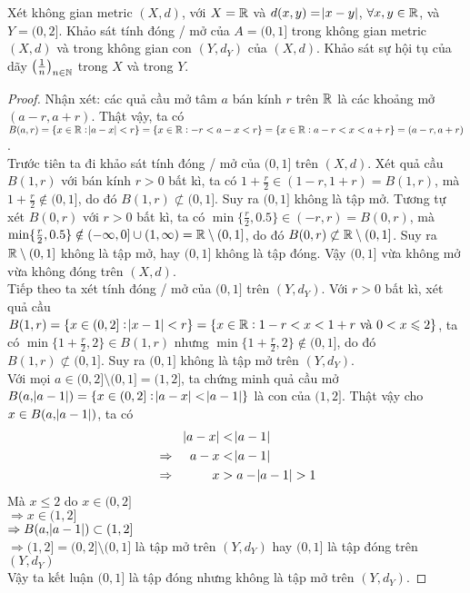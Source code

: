 \begin{exercise}{14}
    Xét không gian metric $(X,d)$, với $X=\mathbb R$ và $d(x,y)=\abs{x-y}$, $\forall x,y \in \mathbb R$, và $Y = (0,2]$. Khảo sát tính đóng / mở của $A=(0,1]$ trong không gian metric $(X,d)$ và trong không gian con $(Y,d_Y)$ của $(X,d)$. Khảo sát sự hội tụ của dãy $\left(\frac{1}{n}\right)_{n\in\mathbb N}$ trong $X$ và trong $Y$.
\end{exercise}

\begin{proof}
Nhận xét: các quả cầu mở tâm $a$ bán kính $r$ trên $\mathbb R$ là các khoảng mở $(a-r,a+r)$. Thật vậy, ta có $B(a,r) = \{x\in\mathbb R : \abs{a-x} < r \} = \{x\in\mathbb R : -r < a-x < r \} = \{x\in\mathbb R : a-r < x < a+r\} = (a-r,a+r)$.\\[3mm]
Trước tiên ta đi khảo sát tính đóng / mở của $(0,1]$ trên $(X,d)$. Xét quả cầu $B(1,r)$ với bán kính $r > 0$ bất kì, ta có $1+\frac{r}{2} \in (1-r,1+r) = B(1,r)$, mà $1 + \frac{r}{2} \notin (0,1]$, do đó $B(1,r) \not\subset (0,1]$. Suy ra $(0,1]$ không là tập mở.\nll
Tương tự xét $B(0,r)$ với $r > 0$ bất kì, ta có $\min\{\frac{r}{2}, 0.5\} \in (-r,r) = B(0,r)$, mà $\min\{\frac{r}{2}, 0.5\} \notin (-\infty,0] \cup (1,\infty) = \mathbb R \setminus (0,1]$, do đó $B(0,r) \not\subset \mathbb R \setminus (0,1]$. Suy ra $\mathbb R \setminus (0,1]$ không là tập mở, hay $(0,1]$ không là tập đóng.\nll
Vậy $(0,1]$ vừa không mở vừa không đóng trên $(X,d)$.\QEDFill\\[3mm]
Tiếp theo ta xét tính đóng / mở của $(0,1]$ trên $(Y,d_Y)$. Với $r > 0$ bất kì, xét quả cầu $B(1,r) = \{x \in (0,2] : \abs{x-1} < r\} = \{x \in \mathbb R : 1-r < x < 1+r \text{ và } 0 < x \leqslant 2\}$, ta có $\min\{1 + \frac{r}{2}, 2\} \in B(1,r)$ nhưng $\min\{1 + \frac{r}{2}, 2\} \notin (0, 1]$, do đó $B(1,r) \not\subset (0,1]$. Suy ra $(0,1]$ không là tập mở trên $(Y,d_Y)$.\\[3mm]
Với mọi $a \in (0,2] \setminus (0,1] = (1,2]$, ta chứng minh quả cầu mở $B(a,\abs{a-1}) =  \{x \in (0,2] : \abs{a-x} < \abs{a-1}\}$ là con của $(1,2]$. Thật vậy cho $x \in B(a,\abs{a-1})$, ta có
\begin{alignat*}{3}
    & & \abs{a-x} &< \abs{a-1}\\
    &\Rightarrow& a-x &< \abs{a-1}\\
    &\Rightarrow& x &> a - \abs{a-1} > 1
\end{alignat*}
Mà $x \leq 2$ do $x \in (0,2]$\\
$\Rightarrow x \in (1,2]$\\
$\Rightarrow B(a,\abs{a-1}) \subset (1,2]$\\
$\Rightarrow (1,2] = (0,2] \setminus (0,1]$ là tập mở trên $(Y,d_Y)$ hay $(0,1]$ là tập đóng trên $(Y,d_Y)$\\
Vậy ta kết luận $(0,1]$ là tập đóng nhưng không là tập mở trên $(Y,d_Y)$.
\end{proof}

